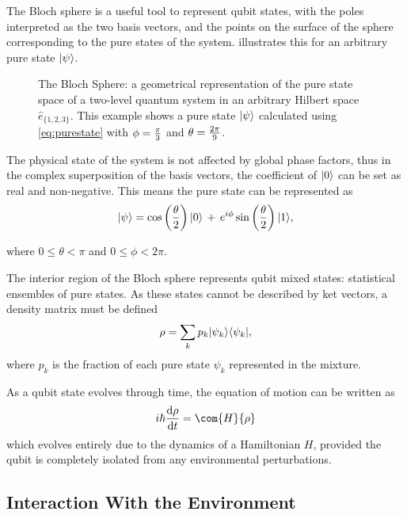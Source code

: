 The Bloch sphere \cite{Bloch1946} is a useful tool to represent qubit states, with the poles interpreted as the two basis vectors, and the points on the surface of the sphere corresponding to the pure states of the system.
 illustrates this for an arbitrary pure state $\lvert\psi\rangle$.
\begin{figure}[htp]
\resizebox{0.5\textwidth}{!}{}
\caption[Bloch Sphere]{\label{fig:bloch}The Bloch Sphere: a geometrical representation of the pure state space of a two-level quantum system in an arbitrary Hilbert space $\hat{e}_{\{1,2,3\}}$. This example shows a pure state $\lvert\psi\rangle$ calculated using \cref{eq:purestate} with $\cramped{\phi=\frac{\pi}{3}}$ and $\cramped{\theta=\frac{2\pi}{9}}$. }
\end{figure}

The physical state of the system is not affected by global phase factors, thus in the complex superposition of the basis vectors, the coefficient of $\lvert0\rangle$ can be set as real and non-negative.
This means the pure state can be represented as
\begin{equation}
\lvert\psi\rangle = \cos\left(\frac{\theta}{2}\right) \lvert0\rangle \, + \, e^{i \phi}  \sin\left(\frac{\theta}{2}\right) \lvert1\rangle,
\label{eq:purestate}
\end{equation}

where $0 \leq \theta < \pi$ and $0 \leq \phi < 2 \pi$.

The interior region of the Bloch sphere represents qubit mixed states: statistical ensembles of pure states.
As these states cannot be described by ket vectors, a density matrix must be defined
\begin{equation}
\rho = \sum_k p_k \lvert\psi_k\rangle \langle\psi_k\rvert,
\label{eq:densmat}
\end{equation}
where $p_k$ is the fraction of each pure state $\psi_k$ represented in the mixture.

As a qubit state evolves through time, the equation of motion can be written as
\begin{equation}
i\hbar \frac{\mathrm{d}\rho}{\mathrm{d}t} = \com{H}{\rho}
\label{eq:tevqubit}
\end{equation}
which evolves entirely due to the dynamics of a Hamiltonian $H$,
provided the qubit is completely isolated from any environmental perturbations.

\subsection{Interaction With the Environment}\label{sec:envint}

